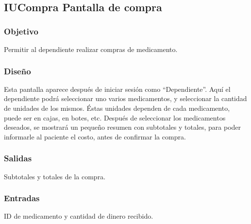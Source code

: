 \subsection{IUCompra Pantalla de compra}

\subsubsection{Objetivo}
	Permitir al dependiente realizar compras de medicamento.

\subsubsection{Diseño}
	Esta pantalla aparece despu\'es de iniciar sesi\'on como "`Dependiente"'. Aqu\'i el dependiente podr\'a seleccionar uno  varios medicamentos, y seleccionar la cantidad de unidades de los mismos. \'Estas unidades dependen de cada medicamento, puede ser en cajas, en botes, etc. Despu\'es de seleccionar los medicamentos deseados, se mostrar\'a un pequeño resumen con subtotales y totales, para poder informarle al paciente el costo, antes de confirmar la compra.


\subsubsection{Salidas}

	Subtotales y totales de la compra.

\subsubsection{Entradas}
ID de medicamento y cantidad de dinero recibido.

